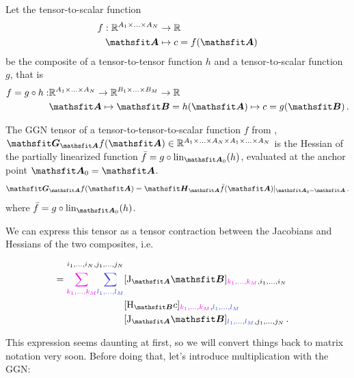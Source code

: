 \begin{setup}\label{setup:composite_tensor_to_tensor_to_scalar_function}
  Let the tensor-to-scalar function
  \begin{align*}
    f: \sR^{A_1 \times \ldots \times A_N} & \to \sR
    \\
    \tA                                   & \mapsto c = f(\tA)
  \end{align*}
  be the composite of a tensor-to-tensor function $h$ and a tensor-to-scalar function $g$, that is
  \begin{align*}
    f = g \circ h: & \sR^{A_1 \times \ldots \times A_N} \to \sR^{B_1 \times \ldots \times B_M}  \to \sR
    \\
                   & \tA \mapsto \tB = h(\tA) \mapsto c = g(\tB)\,.
  \end{align*}
\end{setup}

\begin{definition}\label{def:general_ggn}%
  The GGN tensor of a tensor-to-tensor-to-scalar function $f$ from , $\tG_{\tA} f(\tA) \in \sR^{A_1 \times \ldots \times A_N \times A_1 \times \ldots \times A_N}$ is the Hessian of the partially linearized function $\bar{f} = g \circ \lin_{\tA_0}(h)$, evaluated at the anchor point $\tA_0 = \tA$.
  \begin{align*}
    \tG_{\tA} f(\tA)
    =
    \tH_{\tA} \bar{f}(\tA)|_{\tA_0 = \tA}\,.
  \end{align*}
  where $\bar{f} = g \circ \lin_{\tA_0}(h)$.

  We can express this tensor as a tensor contraction between the Jacobians and Hessians of the two composites, i.e.\,
  \begin{align*}
    [\tG_{\tA} f(\tA)]_{i_1, \ldots, i_N, j_1, \ldots, j_N}
    \\
    =
    \textcolor{VectorPink}{\sum_{k_1, \dots, k_M}}
    \textcolor{VectorBlue}{\sum_{l_1, \dots, l_M}}
     & [\jac_{\tA} \tB]_{\textcolor{VectorPink}{k_1, \dots, k_M}, i_1, \dots, i_N}
    \\
     & [\hess_{\tB} c]_{\textcolor{VectorPink}{k_{1}, \ldots, k_{M}}, \textcolor{VectorBlue}{l_{1}, \ldots, l_{M}}}
    \\
     & [\jac_{\tA} \tB]_{\textcolor{VectorBlue}{l_1, \ldots, l_M}, j_1, \ldots, j_N}\,.
  \end{align*}
\end{definition}
This expression seems daunting at first, so we will convert things back to matrix notation very soon. Before doing that, let's introduce multiplication with the GGN:

